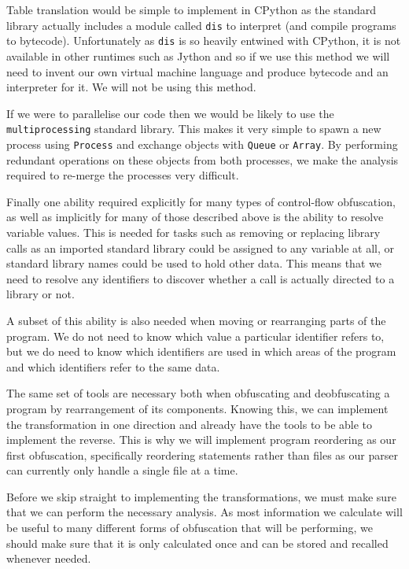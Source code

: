 \documentclass[twoside,a4paper]{report}
\begin{document}
Table translation would be simple to implement in CPython as the standard library actually includes a module called \texttt{dis}
to interpret (and compile programs to bytecode). Unfortunately as \texttt{dis} is so heavily entwined with CPython, it is not available in
other runtimes such as Jython and so if we use this method we will need to invent our own virtual machine language and
produce bytecode and an interpreter for it. We will not be using this method. 

If we were to parallelise our code then we would be likely to use the \texttt{multiprocessing} standard library. This makes it
very simple to spawn a new process using \texttt{Process} and exchange objects with \texttt{Queue} or \texttt{Array}. By
performing redundant operations on these objects from both processes, we make the analysis required to re-merge the processes
very difficult.

Finally one ability required explicitly for many types of control-flow obfuscation, as well as implicitly for many of those
described above is the ability to resolve variable values. This is needed for tasks such as removing or replacing library calls
as an imported standard library could be assigned to any variable at all, or standard library names could be used to hold other
data. This means that we need to resolve any identifiers to discover whether a call is actually directed to a library or not.

A subset of this ability is also needed when moving or rearranging parts of the program. We do not need to know which value a
particular identifier refers to, but we do need to know which identifiers are used in which areas of the program and which
identifiers refer to the same data.

The same set of tools are necessary both when obfuscating and deobfuscating a program by rearrangement of its components. Knowing
this, we can implement the transformation in one direction and already have the tools to be able to implement the reverse.
This is why we will implement program reordering as our first obfuscation, specifically reordering statements rather than
files as our parser can currently only handle a single file at a time.

Before we skip straight to implementing the transformations, we must make sure that we can perform the necessary analysis. As
most information we calculate will be useful to many different forms of obfuscation that will be performing, we should make sure
that it is only calculated once and can be stored and recalled whenever needed.
\end{document}
